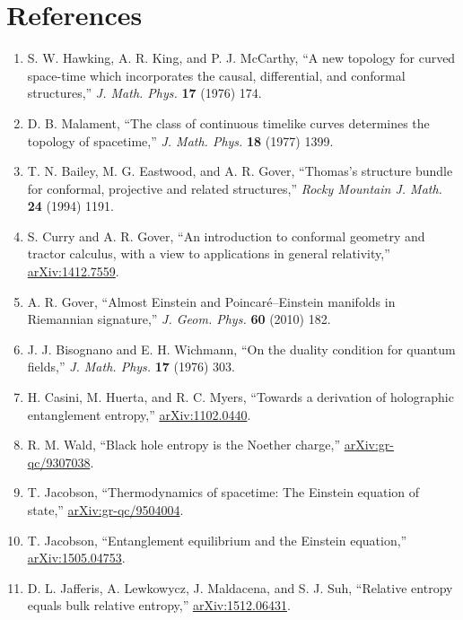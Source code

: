 \documentclass[
  11pt,
  letterpaper,
]{article}
\providecommand{\tightlist}{%
  \setlength{\itemsep}{0pt}\setlength{\parskip}{0pt}}
\begin{document}
\section{References}\label{references}

\begin{enumerate}
\def\labelenumi{\arabic{enumi}.}
\tightlist
\item
  S. W. Hawking, A. R. King, and P. J. McCarthy, ``A new topology for
  curved space-time which incorporates the causal, differential, and
  conformal structures,'' \emph{J. Math. Phys.} \textbf{17} (1976) 174.
\item
  D. B. Malament, ``The class of continuous timelike curves determines
  the topology of spacetime,'' \emph{J. Math. Phys.} \textbf{18} (1977)
  1399.
\item
  T. N. Bailey, M. G. Eastwood, and A. R. Gover, ``Thomas's structure
  bundle for conformal, projective and related structures,'' \emph{Rocky
  Mountain J. Math.} \textbf{24} (1994) 1191.
\item
  S. Curry and A. R. Gover, ``An introduction to conformal geometry and
  tractor calculus, with a view to applications in general relativity,''
  \href{https://arxiv.org/abs/1412.7559}{arXiv:1412.7559}.
\item
  A. R. Gover, ``Almost Einstein and Poincaré--Einstein manifolds in
  Riemannian signature,'' \emph{J. Geom. Phys.} \textbf{60} (2010) 182.
\item
  J. J. Bisognano and E. H. Wichmann, ``On the duality condition for
  quantum fields,'' \emph{J. Math. Phys.} \textbf{17} (1976) 303.
\item
  H. Casini, M. Huerta, and R. C. Myers, ``Towards a derivation of
  holographic entanglement entropy,''
  \href{https://arxiv.org/abs/1102.0440}{arXiv:1102.0440}.
\item
  R. M. Wald, ``Black hole entropy is the Noether charge,''
  \href{https://arxiv.org/abs/gr-qc/9307038}{arXiv:gr-qc/9307038}.
\item
  T. Jacobson, ``Thermodynamics of spacetime: The Einstein equation of
  state,''
  \href{https://arxiv.org/abs/gr-qc/9504004}{arXiv:gr-qc/9504004}.
\item
  T. Jacobson, ``Entanglement equilibrium and the Einstein equation,''
  \href{https://arxiv.org/abs/1505.04753}{arXiv:1505.04753}.
\item
  D. L. Jafferis, A. Lewkowycz, J. Maldacena, and S. J. Suh, ``Relative
  entropy equals bulk relative entropy,''
  \href{https://arxiv.org/abs/1512.06431}{arXiv:1512.06431}.

\end{enumerate}
\end{document}
